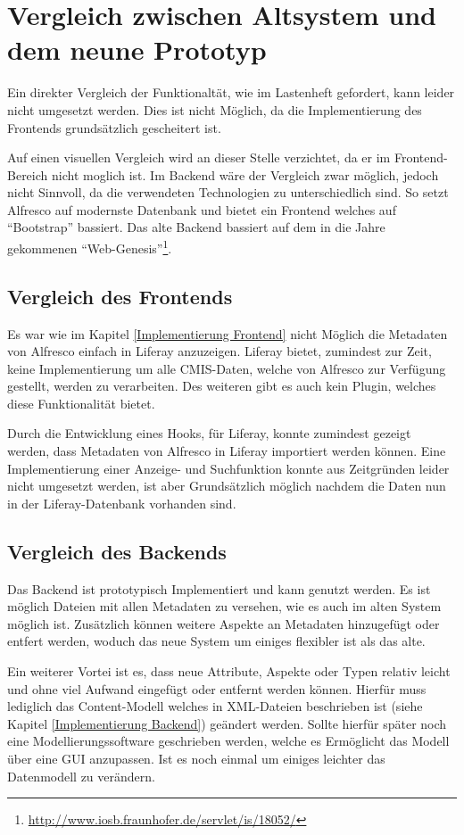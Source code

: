 \section{Vergleich zwischen Altsystem und dem neune Prototyp}
Ein direkter Vergleich der Funktionalt\"at, wie im Lastenheft gefordert, kann leider nicht umgesetzt werden. Dies ist nicht M\"oglich, da die Implementierung des Frontends grunds\"atzlich gescheitert ist. 

Auf einen visuellen Vergleich wird an dieser Stelle verzichtet, da er im Frontend-Bereich nicht moglich ist. Im Backend w\"are der Vergleich zwar m\"oglich, jedoch nicht Sinnvoll, da die verwendeten Technologien zu unterschiedlich sind. So setzt Alfresco auf modernste Datenbank und bietet ein Frontend welches auf "`Bootstrap"' bassiert. Das alte Backend bassiert auf dem in die Jahre gekommenen "`Web-Genesis"'\footnote{\url{http://www.iosb.fraunhofer.de/servlet/is/18052/}}. 

\subsection{Vergleich des Frontends}
Es war wie im Kapitel \ref{Implementierung Frontend} nicht M\"oglich die Metadaten von Alfresco einfach in Liferay anzuzeigen. Liferay bietet, zumindest zur Zeit, keine Implementierung um alle \ac{CMIS}-Daten, welche von Alfresco zur Verf\"ugung gestellt, werden zu verarbeiten.
Des weiteren gibt es auch kein Plugin, welches diese Funktionalit\"at bietet.

Durch die Entwicklung eines Hooks, f\"ur Liferay, konnte zumindest gezeigt werden, dass Metadaten von Alfresco in Liferay importiert werden k\"onnen. Eine Implementierung einer Anzeige- und Suchfunktion konnte aus Zeitgr\"unden leider nicht umgesetzt werden, ist aber Grunds\"atzlich m\"oglich nachdem die Daten nun in der Liferay-Datenbank vorhanden sind. 

\subsection{Vergleich des Backends}
Das Backend ist prototypisch Implementiert und kann genutzt werden. Es ist m\"oglich Dateien mit allen Metadaten zu versehen, wie es auch im alten System m\"oglich ist. Zus\"atzlich k\"onnen weitere Aspekte an Metadaten hinzugef\"ugt oder entfert werden, woduch das neue System um einiges flexibler ist als das alte.

Ein weiterer Vortei ist es, dass neue Attribute, Aspekte oder Typen relativ leicht und ohne viel Aufwand eingef\"ugt oder entfernt werden k\"onnen. Hierf\"ur muss lediglich das Content-Modell welches in XML-Dateien beschrieben ist (siehe Kapitel \ref{Implementierung Backend}) ge\"andert werden. Sollte hierf\"ur sp\"ater noch eine Modellierungssoftware geschrieben werden, welche es Erm\"oglicht das Modell \"uber eine GUI anzupassen. Ist es noch einmal um einiges leichter das Datenmodell zu ver\"andern.

